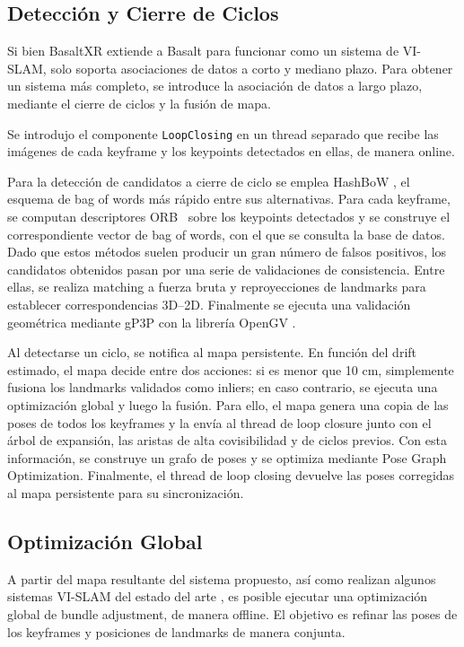 \subsection{Detección y Cierre de Ciclos}
Si bien BasaltXR extiende a Basalt para funcionar como un sistema de VI-SLAM, solo soporta asociaciones de datos a corto y mediano plazo. Para obtener un sistema más completo, se introduce la asociación de datos a largo plazo, mediante el cierre de ciclos y la fusión de mapa.

Se introdujo el componente \texttt{LoopClosing} en un thread separado que recibe las imágenes de cada keyframe y los keypoints detectados en ellas, de manera online.

Para la detección de candidatos a cierre de ciclo se emplea HashBoW \cite{hashbow2024stricker}, el esquema de bag of words más rápido entre sus alternativas. Para cada keyframe, se computan descriptores ORB~\cite{rublee2011orb} sobre los keypoints detectados y se construye el correspondiente vector de bag of words, con el que se consulta la base de datos.
Dado que estos métodos suelen producir un gran número de falsos positivos, los candidatos obtenidos pasan por una serie de validaciones de consistencia. Entre ellas, se realiza matching a fuerza bruta y reproyecciones de landmarks para establecer correspondencias 3D--2D. Finalmente se ejecuta una validación geométrica mediante gP3P \cite{kneip2013gp3p} con la librería OpenGV \cite{kneip2022opengv}.

Al detectarse un ciclo, se notifica al mapa persistente. En función del drift estimado, el mapa decide entre dos acciones: si es menor que 10 cm, simplemente fusiona los landmarks validados como inliers; en caso contrario, se ejecuta una optimización global y luego la fusión. Para ello, el mapa genera una copia de las poses de todos los keyframes y la envía al thread de loop closure junto con el árbol de expansión, las aristas de alta covisibilidad y de ciclos previos. Con esta información, se construye un grafo de poses y se optimiza mediante Pose Graph Optimization. Finalmente, el thread de loop closing devuelve las poses corregidas al mapa persistente para su sincronización.

\subsection{Optimización Global}
A partir del mapa resultante del sistema propuesto, así como realizan algunos sistemas VI-SLAM del estado del arte \cite{campos2021orbslam3} \cite{leutenegger2022okvis2}, es posible ejecutar una optimización global de bundle adjustment, de manera offline. El objetivo es refinar las poses de los keyframes y posiciones de landmarks de manera conjunta.

